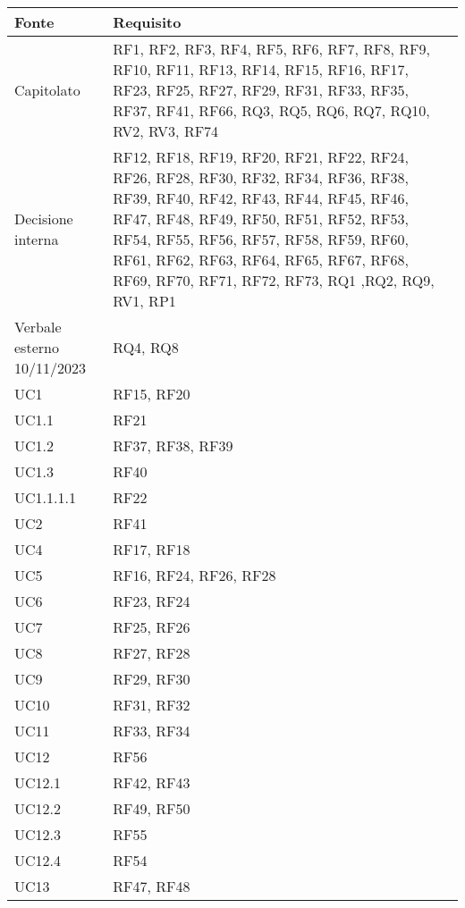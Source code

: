 \begin{center}
    \begin{longtable}{|C{5cm}|C{5cm}|}
        \hline
        \textbf{Fonte} & \textbf{Requisito} \\
        \hline
        Capitolato & RF1, RF2, RF3, RF4, RF5, RF6, RF7, RF8, RF9, RF10, RF11, RF13, RF14, RF15, RF16, RF17, RF23, RF25, RF27, RF29, RF31, RF33, RF35, RF37, RF41, RF66, RQ3, RQ5, RQ6, RQ7, RQ10, RV2, RV3, RF74  \\
        \hline
        Decisione interna & RF12, RF18, RF19, RF20, RF21, RF22, RF24, RF26, RF28, RF30, RF32, RF34, RF36, RF38, RF39, RF40, RF42, RF43, RF44, RF45, RF46, RF47, RF48, RF49, RF50, RF51, RF52, RF53, RF54, RF55, RF56, RF57, RF58, RF59, RF60, RF61, RF62, RF63, RF64, RF65, RF67, RF68, RF69, RF70, RF71, RF72, RF73, RQ1 ,RQ2, RQ9, RV1, RP1 \\
        \hline
        Verbale esterno 10/11/2023 & RQ4, RQ8 \\
        \hline
        UC1 & RF15, RF20 \\
        \hline
        UC1.1 & RF21 \\
        \hline
        UC1.2 & RF37, RF38, RF39 \\
        \hline
        UC1.3 & RF40 \\
        \hline
        UC1.1.1.1 & RF22 \\
        \hline
        UC2 & RF41 \\
        \hline
        UC4 & RF17, RF18 \\
        \hline
        UC5 & RF16, RF24, RF26, RF28\\
        \hline
        UC6 & RF23, RF24\\
        \hline
        UC7 & RF25, RF26 \\
        \hline
        UC8 & RF27, RF28 \\
        \hline
        UC9 & RF29, RF30 \\
        \hline
        UC10 & RF31, RF32 \\
        \hline
        UC11 & RF33, RF34 \\
        \hline
        UC12 & RF56 \\
        \hline
        UC12.1 & RF42, RF43 \\
        \hline
        UC12.2 & RF49, RF50 \\
        \hline
        UC12.3 & RF55 \\
        \hline
        UC12.4 & RF54 \\
        \hline
        UC13 & RF47, RF48 \\

\end{longtable}
\end{center}
